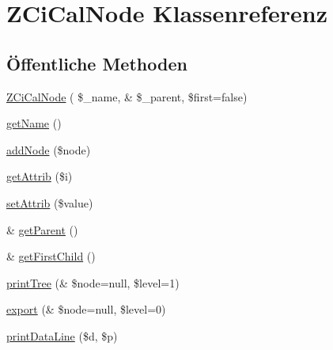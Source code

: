 \hypertarget{class_z_ci_cal_node}{}\section{Z\+Ci\+Cal\+Node Klassenreferenz}
\label{class_z_ci_cal_node}
\subsection*{Öffentliche Methoden}
\begin{DoxyCompactItemize}
\item 
\mbox{\hyperlink{class_z_ci_cal_node_aaf2f2ad80629be8afe65d82a38ea80d6}{Z\+Ci\+Cal\+Node}} ( \$\+\_\+name, \& \$\+\_\+parent, \$first=false)
\item 
\mbox{\hyperlink{class_z_ci_cal_node_ac3b6389ed651b427432df1a4d7a85c2d}{get\+Name}} ()
\item 
\mbox{\hyperlink{class_z_ci_cal_node_ab6f20676b8478e7dc0a70ce47995a28c}{add\+Node}} (\$node)
\item 
\mbox{\hyperlink{class_z_ci_cal_node_af8682a0d31d9afa68ba2bcea7b178963}{get\+Attrib}} (\$i)
\item 
\mbox{\hyperlink{class_z_ci_cal_node_aa8845828e858ae601b2ca44b0890e5e9}{set\+Attrib}} (\$value)
\item 
\& \mbox{\hyperlink{class_z_ci_cal_node_afb1305c51f153ab244078ea2e12ece52}{get\+Parent}} ()
\item 
\& \mbox{\hyperlink{class_z_ci_cal_node_a22f136b7820093017b9d5cc071feda63}{get\+First\+Child}} ()
\item 
\mbox{\hyperlink{class_z_ci_cal_node_a5d514a4d88635145e6a7e62e49e671ae}{print\+Tree}} (\& \$node=null, \$level=1)
\item 
\mbox{\hyperlink{class_z_ci_cal_node_ac540c57c04feb6550992f6b57e86db8a}{export}} (\& \$node=null, \$level=0)
\item 
\mbox{\hyperlink{class_z_ci_cal_node_a5a6d9ff591aeeed0c279b52995aac89c}{print\+Data\+Line}} (\$d, \$p)
\end{DoxyCompactItemize}
